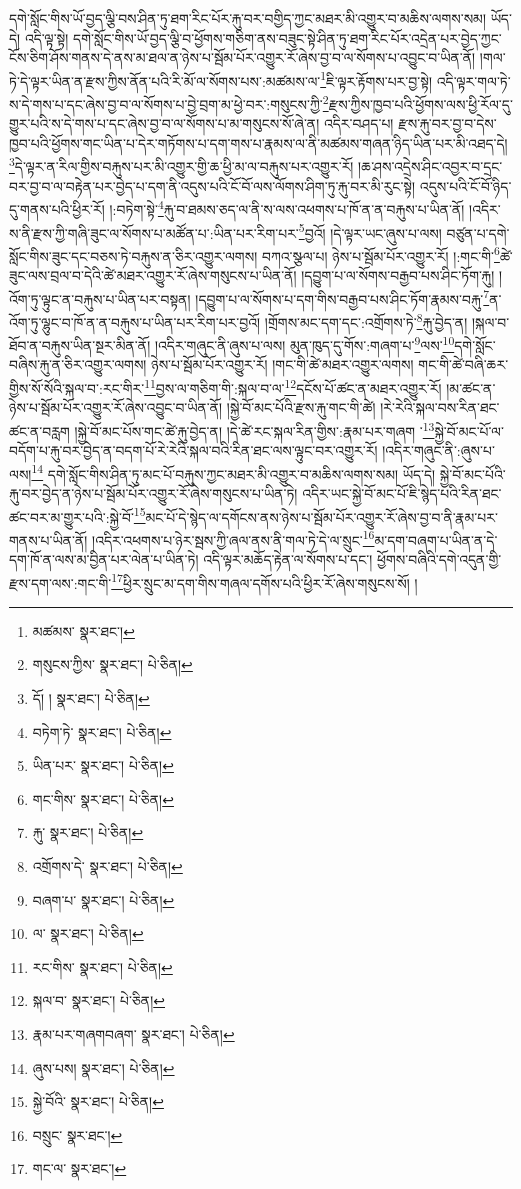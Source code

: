 དགེ་སློང་གིས་ཡོ་བྱད་ལྕི་བས་ཤིན་ཏུ་ཐག་རིང་པོར་རྐུ་བར་བགྱིད་ཀྱང་མཐར་མི་འགྱུར་བ་མཆིས་ལགས་སམ། ཡོད་དེ། འདི་ལྟ་སྟེ། དགེ་སློང་གིས་ཡོ་བྱད་ལྕི་བ་ཕྱོགས་གཅིག་ནས་བཟུང་སྟེ་ཤིན་ཏུ་ཐག་རིང་པོར་འདྲེན་པར་བྱེད་ཀྱང་ངོས་ཅིག་ཤོས་གནས་དེ་ནས་མ་ཐལ་ན་ཉེས་པ་སྦོམ་པོར་འགྱུར་རོ་ཞེས་བྱ་བ་ལ་སོགས་པ་འབྱུང་བ་ཡིན་ནོ། །གལ་ཏེ་དེ་ལྟར་ཡིན་ན་རྫས་ཀྱིས་ནོན་པའི་རི་མོ་ལ་སོགས་པས་:མཚམས་ལ་\footnote{མཚམས་  སྣར་ཐང་། }ཇི་ལྟར་རྟོགས་པར་བྱ་སྟེ། འདི་ལྟར་གལ་ཏེ་ས་དེ་གས་པ་དང་ཞེས་བྱ་བ་ལ་སོགས་པ་བྱེ་བྲག་མ་ཕྱེ་བར་:གསུངས་ཀྱི་\footnote{གསུངས་ཀྱིས་  སྣར་ཐང་།  པེ་ཅིན། }རྫས་ཀྱིས་ཁྱབ་པའི་ཕྱོགས་ལས་ཕྱི་རོལ་དུ་གྱུར་པའི་ས་དེ་གས་པ་དང་ཞེས་བྱ་བ་ལ་སོགས་པ་མ་གསུངས་སོ་ཞེ་ན། འདིར་བཤད་པ། རྫས་རྐུ་བར་བྱ་བ་དེས་ཁྱབ་པའི་ཕྱོགས་གང་ཡིན་པ་དེར་གཏོགས་པ་དག་གས་པ་རྣམས་ལ་ནི་མཚམས་གཞན་ཉིད་ཡིན་པར་མི་འཐད་དེ། \footnote{དོ། །   སྣར་ཐང་།  པེ་ཅིན། }དེ་ལྟར་ན་རིལ་གྱིས་བརྐུས་པར་མི་འགྱུར་གྱི་ཆ་ཕྱི་མ་ལ་བརྐུས་པར་འགྱུར་རོ། །ཆ་ཤས་འདྲེས་ཤིང་འབྱར་བ་དྲང་བར་བྱ་བ་ལ་བརྟེན་པར་བྱེད་པ་དག་ནི་འདུས་པའི་ངོ་བོ་ལས་ལོགས་ཤིག་ཏུ་རྐུ་བར་མི་རུང་སྟེ། འདུས་པའི་ངོ་བོ་ཉིད་དུ་གནས་པའི་ཕྱིར་རོ། །:བཏེག་སྟེ་\footnote{བཏེག་ཏེ་  སྣར་ཐང་།  པེ་ཅིན། }རྐུ་བ་ཐམས་ཅད་ལ་ནི་ས་ལས་འཕགས་པ་ཁོ་ན་ན་བརྐུས་པ་ཡིན་ནོ། །འདིར་ས་ནི་རྫས་ཀྱི་གཞི་ཟུང་ལ་སོགས་པ་མཚོན་པ་:ཡིན་པར་རིག་པར་\footnote{ཡིན་པར་  སྣར་ཐང་།  པེ་ཅིན། }བྱའོ། །དེ་ལྟར་ཡང་ཞུས་པ་ལས། བཙུན་པ་དགེ་སློང་གིས་ཟུང་དང་བཅས་ཏེ་བརྐུས་ན་ཅིར་འགྱུར་ལགས། བཀའ་སྩལ་པ། ཉེས་པ་སྦོམ་པོར་འགྱུར་རོ། །:གང་གི་\footnote{གང་གིས་  སྣར་ཐང་།  པེ་ཅིན། }ཚེ་ཟུང་ལས་བྲལ་བ་དེའི་ཚེ་མཐར་འགྱུར་རོ་ཞེས་གསུངས་པ་ཡིན་ནོ། །དབྱུག་པ་ལ་སོགས་བརྒྱབ་པས་ཤིང་ཏོག་རྐུ། །འོག་ཏུ་ལྟུང་ན་བརྐུས་པ་ཡིན་པར་བསྟན། །དབྱུག་པ་ལ་སོགས་པ་དག་གིས་བརྒྱབ་པས་ཤིང་ཏོག་རྣམས་བརྐུ་\footnote{རྐུ་  སྣར་ཐང་།  པེ་ཅིན། }ན་འོག་ཏུ་ལྷུང་བ་ཁོ་ན་ན་བརྐུས་པ་ཡིན་པར་རིག་པར་བྱའོ། །གྲོགས་མང་དག་དང་:འགྲོགས་ཏེ་\footnote{འགྲོགས་དེ་  སྣར་ཐང་།  པེ་ཅིན། }རྐུ་བྱེད་ན། །སྐལ་བ་ཐོབ་ན་བརྐུས་ཡིན་སྔར་མིན་ནོ། །འདིར་གཞུང་ནི་ཞུས་པ་ལས། མུན་ཁུད་དུ་གོས་:གཞག་པ་\footnote{བཞག་པ་  སྣར་ཐང་།  པེ་ཅིན། }ལས་\footnote{ལ་  སྣར་ཐང་།  པེ་ཅིན། }དགེ་སློང་བཞིས་རྐུ་ན་ཅིར་འགྱུར་ལགས། ཉེས་པ་སྦོམ་པོར་འགྱུར་རོ། །གང་གི་ཚེ་མཐར་འགྱུར་ལགས། གང་གི་ཚེ་བཞི་ཆར་གྱིས་སོ་སོའི་སྐལ་བ་:རང་གིར་\footnote{རང་གིས་  སྣར་ཐང་།  པེ་ཅིན། }བྱས་ལ་གཅིག་གི་:སྐལ་བ་ལ་\footnote{སྐལ་བ་  སྣར་ཐང་།  པེ་ཅིན། }དངོས་པོ་ཚང་ན་མཐར་འགྱུར་རོ། །མ་ཚང་ན་ཉེས་པ་སྦོམ་པོར་འགྱུར་རོ་ཞེས་འབྱུང་བ་ཡིན་ནོ། །སྐྱེ་བོ་མང་པོའི་རྫས་རྐུ་གང་གི་ཚེ། །རེ་རེའི་སྐལ་བས་རིན་ཐང་ཚང་ན་བརླག །སྐྱེ་བོ་མང་པོས་གང་ཚེ་རྐུ་བྱེད་ན། །དེ་ཚེ་རང་སྐལ་རིན་གྱིས་:རྣམ་པར་གཞག ་\footnote{རྣམ་པར་གཞགབཞག་  སྣར་ཐང་།  པེ་ཅིན། }སྐྱེ་བོ་མང་པོ་ལ་བདོག་པ་རྐུ་བར་བྱེད་ན་བདག་པོ་རེ་རེའི་སྐལ་བའི་རིན་ཐང་ལས་ལྟུང་བར་འགྱུར་རོ། །འདིར་གཞུང་ནི་:ཞུས་པ་ལས།\footnote{ཞུས་པས།  སྣར་ཐང་།  པེ་ཅིན། } དགེ་སློང་གིས་ཤིན་ཏུ་མང་པོ་བརྐུས་ཀྱང་མཐར་མི་འགྱུར་བ་མཆིས་ལགས་སམ། ཡོད་དེ། སྐྱེ་བོ་མང་པོའི་རྐུ་བར་བྱེད་ན་ཉེས་པ་སྦོམ་པོར་འགྱུར་རོ་ཞེས་གསུངས་པ་ཡིན་ཏེ། འདིར་ཡང་སྐྱེ་བོ་མང་པོ་ཇི་སྙེད་པའི་རིན་ཐང་ཚང་བར་མ་གྱུར་པའི་:སྐྱེ་བོ་\footnote{སྐྱེ་བོའི་  སྣར་ཐང་།  པེ་ཅིན། }མང་པོ་དེ་སྙེད་ལ་དགོངས་ནས་ཉེས་པ་སྦོམ་པོར་འགྱུར་རོ་ཞེས་བྱ་བ་ནི་རྣམ་པར་གནས་པ་ཡིན་ནོ། །འདིར་འཕགས་པ་ཉེར་སྦས་ཀྱི་ཞལ་ནས་ནི་གལ་ཏེ་དེ་ལ་སྲུང་\footnote{བསྲུང་  སྣར་ཐང་། }མ་དག་བཞག་པ་ཡིན་ན་དེ་དག་ཁོ་ན་ལས་མ་བྱིན་པར་ལེན་པ་ཡིན་ཏེ། འདི་ལྟར་མཆོད་རྟེན་ལ་སོགས་པ་དང་། ཕྱོགས་བཞིའི་དགེ་འདུན་གྱི་རྫས་དག་ལས་:གང་གི་\footnote{གང་ལ་  སྣར་ཐང་། }ཕྱིར་སྲུང་མ་དག་གིས་གཞལ་དགོས་པའི་ཕྱིར་རོ་ཞེས་གསུངས་སོ། །
